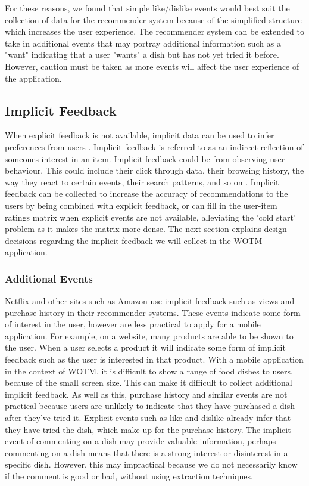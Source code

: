 For these reasons, we found that simple like/dislike events would best suit the collection of data for the recommender system because of the simplified structure which increases the user experience. The recommender system can be extended to take in additional events that may portray additional information such as a "want" indicating that a user "wants" a dish but has not yet tried it before. However, caution must be taken as more events will affect the user experience of the application. 

\subsection{Implicit Feedback}

When explicit feedback is not available, implicit data can be used to infer preferences from users \cite{koren2009matrix}. Implicit feedback is referred to as an indirect reflection of someones interest in an item. Implicit feedback could be from observing user behaviour. This could include their click through data, their browsing history, the way they react to certain events, their search patterns, and so on \cite{koren2009matrix}. Implicit feedback can be collected to increase the accuracy of recommendations to the users by being combined with explicit feedback, or can fill in the user-item ratings matrix when explicit events are not available, alleviating the 'cold start' problem as it makes the matrix more dense. The next section explains design decisions regarding the implicit feedback we will collect in the WOTM application.

\subsubsection{Additional Events}

Netflix and other sites such as Amazon \cite{koren2009matrix, schafer2007collaborative} use implicit feedback such as views and purchase history in their recommender systems. These events indicate some form of interest in the user, however are less practical to apply for a mobile application. For example, on a website, many products are able to be shown to the user. When a user selects a product it will indicate some form of implicit feedback such as the user is interested in that product. With a mobile application in the context of WOTM, it is difficult to show a range of food dishes to users, because of the small screen size. This can make it difficult to collect additional implicit feedback. As well as this, purchase history and similar events are not practical because users are unlikely to indicate that they have purchased a dish after they've tried it. Explicit events such as like and dislike already infer that they have tried the dish, which make up for the purchase history. The implicit event of commenting on a dish may provide valuable information, perhaps commenting on a dish means that there is a strong interest or disinterest in a specific dish. However, this may impractical because we do not necessarily know if the comment is good or bad, without using extraction techniques.

